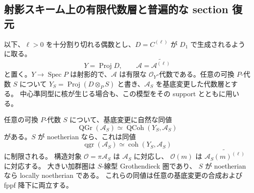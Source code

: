 \subsection{射影スキーム上の有限代数層と普遍的な section 復元}

以下、$\ell>0$ を十分割り切れる偶数とし、$D=C^{(\ell)}$ が $D_1$ で生成されるように取る。
\[
 Y=\operatorname{Proj}D,\qquad
 \mathscr A=\widetilde{\mathcal A^{(\ell)}}
\]
と置く。$Y\to\operatorname{Spec}P$ は射影的で、$\mathscr A$ は有限な
$\mathcal O_Y$-代数である。任意の可換 $P$-代数 $S$ について
$Y_S=\operatorname{Proj}(D\otimes_P S)$ と書き、$\mathscr A_S$ を基底変更した代数層とする。
中心準同型に核が生じる場合も、この模型をその support とともに用いる。

\begin{proposition}
\label{prop:central-model-qgr}
任意の可換 $P$-代数 $S$ について、基底変更に自然な同値
\[
 \operatorname{QGr}(\mathcal A_S)
 \simeq \operatorname{QCoh}(Y_S,\mathscr A_S)
\]
がある。$S$ が noetherian なら、これは同値
\[
 \operatorname{qgr}(\mathcal A_S)
 \simeq \operatorname{coh}(Y_S,\mathscr A_S)
\]
に制限される。
構造対象 $\mathcal O=\pi\mathcal A_S$ は $\mathscr A_S$ に対応し、
$\mathcal O(m)$ は
$\widetilde{\mathcal A_S(m)^{(\ell)}}$ に対応する。
大きい加群圏は $S$-線型 Grothendieck 圏であり、
$S$ が noetherian なら locally noetherian である。
これらの同値は任意の基底変更の合成および fppf 降下に両立する。
\end{proposition}

